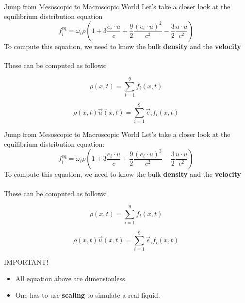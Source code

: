 \documentclass[9pt]{beamer}
\begin{document}
\begin{frame}[t]{Jump from Mesoscopic to Macroscopic World}
Let's take a closer look at the equilibrium distribution equation
\begin{equation*}
f_i^\text{eq} = \omega_i \rho \left(1 + 3\frac{e_i \cdot u}{c} + \frac92 \frac{(e_i \cdot u)^2}{c^2} - \frac32 \frac{u\cdot u}{c^2}\right)
\end{equation*}
To compute this equation, we need to know the bulk \textbf{density} and the \textbf{velocity} \\~\\

These can be computed as follows:

\begin{equation*}
\rho(x, t) = \sum_{i=1}^{9}{f_i}(x, t)
\end{equation*}

\begin{equation*}
\rho(x, t)\vec{u}(x, t) = \sum_{i=1}^{9}\vec{e}_i{f_i}(x, t)
\end{equation*}
\end{frame}

\begin{frame}[t]{Jump from Mesoscopic to Macroscopic World}
Let's take a closer look at the equilibrium distribution equation:
\begin{equation*}
f_i^\text{eq} = \omega_i \rho \left(1 + 3\frac{e_i \cdot u}{c} + \frac92 \frac{(e_i \cdot u)^2}{c^2} - \frac32 \frac{u\cdot u}{c^2}\right)
\end{equation*}
To compute this equation, we need to know the bulk \textbf{density} and the \textbf{velocity} \\~\\

These can be computed as follows:

\begin{equation*}
\rho(x, t) = \sum_{i=1}^{9}{f_i}(x, t)
\end{equation*}

\begin{equation*}
\rho(x, t)\vec{u}(x, t) = \sum_{i=1}^{9}\vec{e}_i{f_i}(x, t)
\end{equation*}
\begin{alertblock}{IMPORTANT!}
\begin{itemize}
\item
All equation above are dimensionless.
\item
One has to use \textbf{scaling} to simulate a real liquid.
\end{itemize}
\end{alertblock}
\end{frame}
\end{document}
